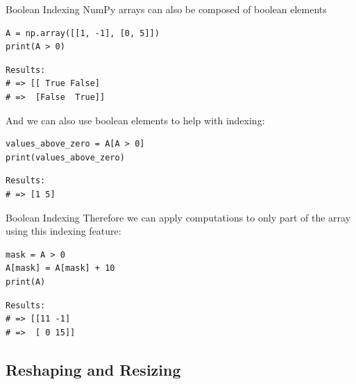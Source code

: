 \documentclass[10pt]{beamer}
\begin{document}
\begin{frame}[label={sec:orgb8a848c},fragile]{Boolean Indexing}
 NumPy arrays can also be composed of boolean elements

\begin{verbatim}
A = np.array([[1, -1], [0, 5]])
print(A > 0)
\end{verbatim}

\begin{verbatim}
Results: 
# => [[ True False]
# =>  [False  True]]
\end{verbatim}


And we can also use boolean elements to help with indexing:

\begin{verbatim}
values_above_zero = A[A > 0]
print(values_above_zero)
\end{verbatim}

\begin{verbatim}
Results: 
# => [1 5]
\end{verbatim}
\end{frame}

\begin{frame}[label={sec:orgb258b18},fragile]{Boolean Indexing}
 Therefore we can apply computations to only part of the array using this indexing
feature:

\begin{verbatim}
mask = A > 0
A[mask] = A[mask] + 10
print(A)
\end{verbatim}

\begin{verbatim}
Results: 
# => [[11 -1]
# =>  [ 0 15]]
\end{verbatim}
\end{frame}

\subsection{Reshaping and Resizing}
\label{sec:org3c5996b}
\end{document}

